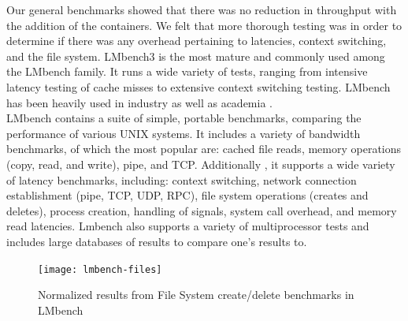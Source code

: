 Our general benchmarks showed that there was no reduction in throughput with the addition of the containers.  We felt that more thorough testing was in order to determine if there was any overhead pertaining to latencies, context switching, and the file system.  LMbench3 is the most mature and commonly used among the LMbench family.  It runs a wide variety of tests, ranging from intensive latency testing of cache misses to extensive context switching testing.  LMbench has been heavily used in industry as well as academia \cite{lmbench}. \\

LMbench contains a suite of simple, portable benchmarks, comparing the performance of various UNIX systems.  It includes a variety of bandwidth benchmarks, of which the most popular are: cached file reads, memory operations (copy, read, and write), pipe, and TCP.  Additionally , it supports a wide variety of latency benchmarks, including: context switching, network connection establishment (pipe, TCP, UDP, RPC), file system operations (creates and deletes), process creation, handling of signals, system call overhead, and memory read latencies.  Lmbench also supports a variety of multiprocessor tests and includes large databases of results to compare one's results to. \cite{lmbench_paper}

\begin{figure}[bth]
\centering
\texttt{[image: lmbench-files]}
\caption{Normalized results from File System create/delete benchmarks in LMbench}
\label{fig:lmbench-files}
\end{figure}
